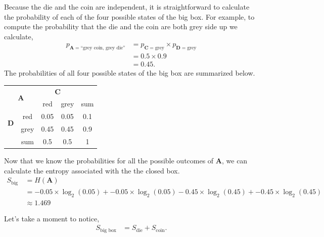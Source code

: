 Because the die and the coin are independent, it is straightforward to calculate the probability of each of the four possible states of the big box.
For example, to compute the probability that the die and the coin are both grey side up we calculate,
\begin{align*}
p_{\bm{A} = \text{``grey coin, grey die''}}
&= p_{\bm{C} = \text{grey}} \times p_{\bm{D} = \text{grey}} \\
&= 0.5 \times 0.9 \\
&= 0.45.
\end{align*}
The probabilities of all four possible states of the big box are summarized below.
\begin{center}
 \begin{tabular}{c c || c | c || c}
 \multicolumn{2}{c}{\multirow{2}{*}{$\bm{A}$}} & \multicolumn{2}{c}{$\bm{C}$} & {}\\
\multicolumn{2}{c}{} & red & grey & sum \\ [0.5ex]
 \hline\hline
\multirow{2}{*}{$\bm{D}$} & red & 0.05 & 0.05 & 0.1 \\
 \cline{2-5}
 & grey & 0.45 & 0.45 & 0.9 \\
 \hline\hline
  {} & sum & 0.5 & 0.5 & 1 \\ [1ex]
\end{tabular}
\end{center}

Now that we know the probabilities for all the possible outcomes of $\bm{A}$, we can calculate the entropy associated with the the closed box.
\begin{align*}
S_{\text{big box}}
&=
H(\bm{A}) \\
&=
- 0.05 \times \log_2(0.05)
+ - 0.05 \times \log_2(0.05)
- 0.45 \times \log_2(0.45)
+ - 0.45 \times \log_2(0.45) \\
&\approx 1.469
\end{align*}

Let's take a moment to notice,
\begin{align*}
S_{\text{big box}}
&=
S_{\text{die}} + S_{\text{coin}}.
\end{align*}

